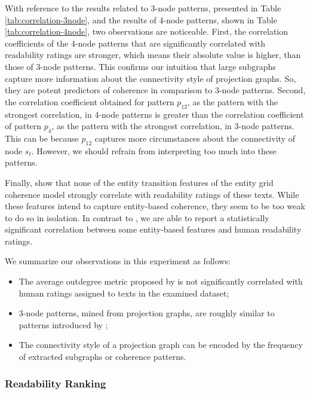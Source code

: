 With reference to the results related to 3-node patterns, presented in Table \ref{tab:correlation-3node}, and the results of 4-node patterns, shown in Table \ref{tab:correlation-4node}, two observations are noticeable. 
First, the correlation coefficients of the 4-node patterns that are significantly correlated with readability ratings are stronger, which means their absolute value is higher, than those of 3-node patterns. 
This confirms our intuition that large subgraphs capture more information about the connectivity style of projection graphs. 
So, they are potent predictors of coherence in comparison to 3-node patterns. 
Second, the correlation coefficient obtained for pattern $p_{12}$, as the pattern with the strongest correlation, in 4-node patterns is greater than the correlation coefficient of pattern $p_4$, as the pattern with the strongest correlation, in 3-node patterns. 
This can be because $p_{12}$ captures more circumstances about the connectivity of node $s_t$. 
However, we should refrain from interpreting too much into these patterns. 

Finally,  show that none of the entity transition features of the entity grid coherence model strongly correlate with readability ratings of these texts. 
While these features intend to capture entity-based coherence, they seem to be too weak to do so in isolation. 
In contrast to , we are able to report a statistically significant correlation between some entity-based features and human readability ratings.

We summarize our observations in this experiment as follows: 

\begin{itemize}

	\item The average outdegree metric proposed by  is not significantly correlated with human ratings assigned to texts in the examined dataset;

	\item 3-node patterns, mined from projection graphs, are roughly similar to patterns introduced by ;

	\item The connectivity style of a projection graph can be encoded by the frequency of extracted subgraphs or coherence patterns.

\end{itemize}


\subsubsection{Readability Ranking}

